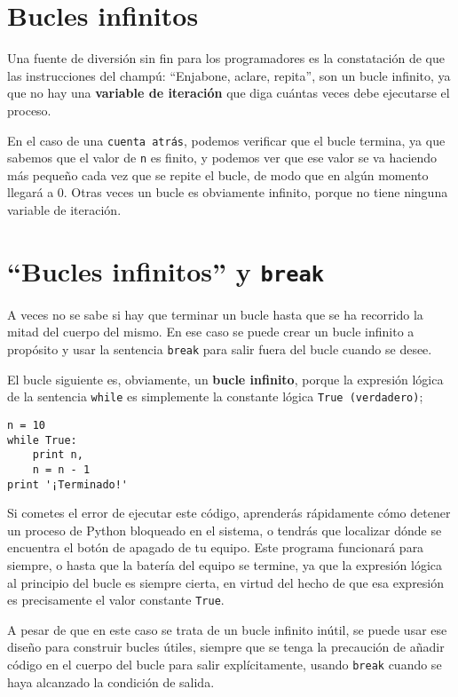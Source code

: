 \section{Bucles infinitos}

Una fuente de diversión sin fin para
los programadores es la constatación de que las instrucciones del champú:
``Enjabone, aclare, repita'', son un bucle infinito, ya que
no hay una {\bf variable de iteración} que diga cuántas veces
debe ejecutarse el proceso.


En el caso de una {\tt cuenta atrás}, podemos verificar que el bucle
termina, ya que sabemos que el valor de {\tt n} es finito, y podemos
ver que ese valor se va haciendo más pequeño cada vez que
se repite el bucle, de modo que en algún momento llegará a 0. Otras veces
un bucle es obviamente infinito, porque no tiene ninguna variable de iteración.

\section{``Bucles infinitos'' y {\tt break}}

A veces no se sabe si hay que terminar un bucle hasta que se ha
recorrido la mitad del cuerpo del mismo. En ese caso se puede crear un bucle infinito a propósito
y usar la sentencia {\tt break} para salir fuera del bucle cuando se desee.

El bucle siguiente es, obviamente, un {\bf bucle infinito}, porque la
expresión lógica de la sentencia
{\tt while} es simplemente la constante lógica {\tt True (verdadero)};

\beforeverb
\begin{verbatim}
n = 10
while True:
    print n, 
    n = n - 1
print '¡Terminado!'
\end{verbatim}
\afterverb
%
Si cometes el error de ejecutar este código, aprenderás rápidamente cómo
detener un proceso de Python bloqueado en el sistema, o tendrás que localizar dónde
se encuentra el botón de apagado de tu equipo.
Este programa funcionará para siempre,
o hasta que la batería del equipo se termine,
ya que la expresión lógica al principio del bucle
es siempre cierta, en virtud del hecho de que esa expresión es
precisamente el valor constante {\tt True}.
 
A pesar de que en este caso se trata de un bucle infinito inútil, se puede usar ese diseño
para construir bucles útiles, siempre que se tenga la precaución de añadir código
en el cuerpo del bucle para salir explícitamente, usando {\tt break}
cuando se haya alcanzado la condición de salida.

